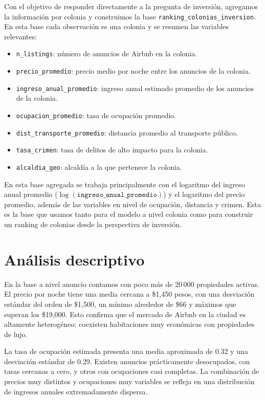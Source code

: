 \documentclass[12pt]{article}
\begin{document}
Con el objetivo de responder directamente a la pregunta de inversión, agregamos la información por colonia y construimos la base \texttt{ranking\_colonias\_inversion}. En esta base cada observación es una colonia y se resumen las variables relevantes:

\begin{itemize}
  \item \texttt{n\_listings}: número de anuncios de Airbnb en la colonia.
  \item \texttt{precio\_promedio}: precio medio por noche entre los anuncios de la colonia.
  \item \texttt{ingreso\_anual\_promedio}: ingreso anual estimado promedio de los anuncios de la colonia.
  \item \texttt{ocupacion\_promedio}: tasa de ocupación promedio.
  \item \texttt{dist\_transporte\_promedio}: distancia promedio al transporte público.
  \item \texttt{tasa\_crimen}: tasa de delitos de alto impacto para la colonia.
  \item \texttt{alcaldia\_geo}: alcaldía a la que pertenece la colonia.
\end{itemize}

En esta base agregada se trabaja principalmente con el logaritmo del ingreso anual promedio (\(\log(\texttt{ingreso\_anual\_promedio})\)) y el logaritmo del precio promedio, además de las variables en nivel de ocupación, distancia y crimen. Esta es la base que usamos tanto para el modelo a nivel colonia como para construir un ranking de colonias desde la perspectiva de inversión.

\section{Análisis descriptivo}

En la base a nivel anuncio contamos con poco más de 20\,000 propiedades activas. El precio por noche tiene una media cercana a \$1{,}450 pesos, con una desviación estándar del orden de \$1{,}500, un mínimo alrededor de \$66 y máximos que superan los \$19{,}000. Esto confirma que el mercado de Airbnb en la ciudad es altamente heterogéneo: coexisten habitaciones muy económicas con propiedades de lujo.

La tasa de ocupación estimada presenta una media aproximada de 0.32 y una desviación estándar de 0.29. Existen anuncios prácticamente desocupados, con tasas cercanas a cero, y otros con ocupaciones casi completas. La combinación de precios muy distintos y ocupaciones muy variables se refleja en una distribución de ingresos anuales extremadamente dispersa.
\end{document}
